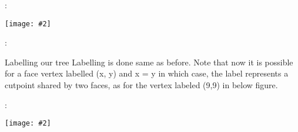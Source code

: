 \documentclass{beamer}
\newcommand{\iph}[2]{
    \texttt{[image: \#2]}
}
\begin{document}
\begin{frame}{\secname : \subsecname}
    \iph{0.9}{lin3}

\end{frame}

\begin{frame}{\secname : \subsecname}
    \begin{block}{Labelling our tree}
        Labelling is done same as before. Note that now it is possible for a face vertex labelled (x, y) and x = y in which case, the label
        represents a cutpoint shared by two faces, as for the vertex labeled (9,9) in
        below figure.
    \end{block}

\end{frame}

\begin{frame}{\secname : \subsecname}
    \iph{0.9}{lin4}

\end{frame}
\end{document}
